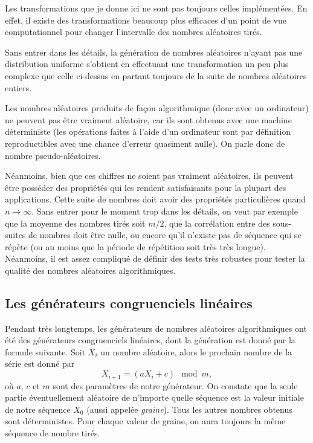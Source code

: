 \documentclass[a4paper,12pt]{book}
\begin{document}
Les transformations que je donne ici ne sont pas toujours celles implémentées. En effet,
il existe des transformations beaucoup plus efficaces d'un point de vue computationnel
pour changer l'intervalle des nombres aléatoires tirés.

Sans entrer dans les détails, la génération de nombres aléatoires n'ayant pas une distribution
uniforme s'obtient en effectuant une transformation un peu plus complexe que celle ci-dessus
en partant toujours de la suite de nombres aléatoires entiers.

Les nombres aléatoires produits de façon algorithmique (donc avec un ordinateur)
ne peuvent pas être vraiment aléatoire, car ils sont obtenus avec une machine 
déterministe (les opérations faites à l'aide d'un ordinateur sont par définition
reproductibles avec une chance d'erreur quasiment nulle). On parle donc de nombre pseudo-aléatoires.

Néanmoins, bien que ces chiffres ne soient pas vraiment aléatoires, ils peuvent 
être posséder des propriétés qui les rendent satisfaisants pour la plupart des applications. Cette suite de nombres doit avoir des propriétés particulières quand $n\rightarrow\infty$.
Sans entrer pour le moment trop dans les détails, on veut par exemple que 
la moyenne des nombres tirés soit $m/2$, que la corrélation entre des 
sous-suites de nombres doit être nulle, ou encore qu'il n'existe pas de séquence qui se 
répète (ou au moins que la période de répétition soit très très longue).
Néanmoins, il est assez compliqué de définir des tests
très robustes pour tester la qualité des nombres aléatoires algorithmiques.


\subsection{Les générateurs congruenciels linéaires}\label{sec_congr}

Pendant très longtemps, les générateurs de nombres aléatoires algorithmiques
ont été des générateurs congruenciels linéaires, dont la génération est 
donné par la formule suivante. Soit $X_i$ un nombre aléatoire,
alors le prochain nombre de la série est donné par
\begin{equation}
X_{i+1}=(aX_i+c)\mod m,
\end{equation}
où $a$, $c$ et $m$ sont des paramètres de notre générateur. 
On constate que la seule partie 
éventuellement aléatoire de n'importe quelle séquence est la valeur initiale 
de notre séquence $X_0$ (aussi appelée \textit{graine}). 
Tous les autres nombres obtenus sont déterministes. Pour chaque valeur de graine, 
on aura toujours la même séquence de nombre tirés.
\end{document}

